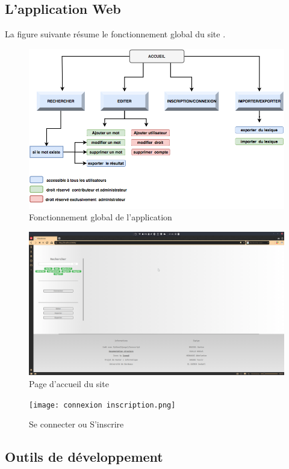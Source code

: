 \documentclass[a4paper, 12pt]{article}
\begin{document}
\subsection{L'application Web}
 La figure suivante résume le fonctionnement global du site .
\begin{figure}[H]
    \includegraphics[scale=0.65]{fonctionnement.png}
    \caption{Fonctionnement global de l'application }
\end{figure}
\begin{figure}[H]
    \includegraphics[scale=0.27]{acceuil.png}
    \caption{Page d'accueil du site}
\end{figure}
\begin{figure}[H]
    \texttt{[image: connexion inscription.png]}
    \caption{Se connecter ou S'inscrire }
\end{figure}
\subsection{Outils de développement}
\end{document}
